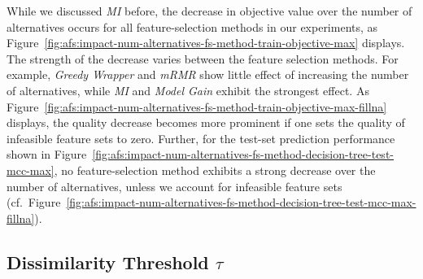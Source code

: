 \documentclass{article}
\theoremstyle{definition}
\begin{document}
While we discussed \emph{MI} before, the decrease in objective value over the number of alternatives occurs for all feature-selection methods in our experiments, as Figure~\ref{fig:afs:impact-num-alternatives-fs-method-train-objective-max} displays.
The strength of the decrease varies between the feature selection methods.
For example, \emph{Greedy Wrapper} and \emph{mRMR} show little effect of increasing the number of alternatives, while \emph{MI} and \emph{Model Gain} exhibit the strongest effect.
As Figure~\ref{fig:afs:impact-num-alternatives-fs-method-train-objective-max-fillna} displays, the quality decrease becomes more prominent if one sets the quality of infeasible feature sets to zero.
Further, for the test-set prediction performance shown in Figure~\ref{fig:afs:impact-num-alternatives-fs-method-decision-tree-test-mcc-max}, no feature-selection method exhibits a strong decrease over the number of alternatives, unless we account for infeasible feature sets (cf.~Figure~\ref{fig:afs:impact-num-alternatives-fs-method-decision-tree-test-mcc-max-fillna}).

\subsection{Dissimilarity Threshold \texorpdfstring{$\tau$}{}}
\label{sec:afs:evaluation:tau}
\end{document}
